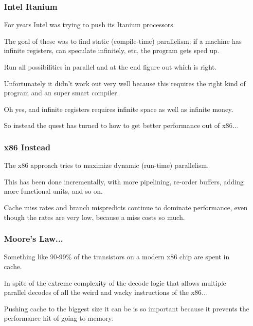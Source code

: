 \begin{frame}
\frametitle{Intel Itanium}

For years Intel was trying to push its Itanium processors. 

The goal of these was to find static (compile-time) parallelism: if a machine has infinite registers, can speculate infinitely, etc, the program gets sped up. 

Run all possibilities in parallel and at the end figure out which is right.

Unfortunately it didn't work out very well because this requires the right kind of program and an super smart compiler. 

Oh yes, and infinite registers requires infinite space as well as infinite money. 

So instead the quest has turned to how to get better performance out of x86...

\end{frame}



\begin{frame}
\frametitle{x86 Instead}

The x86 approach tries to maximize dynamic (run-time) parallelism. 

This has been done incrementally, with more pipelining, re-order buffers, adding more functional units, and so on. 

Cache miss rates and branch mispredicts continue to dominate performance, even though the rates are very low, because a miss costs so much. 

\end{frame}



\begin{frame}
\frametitle{Moore's Law...}

Something like 90-99\% of the transistors on a modern x86 chip are spent in cache. 

In spite of the extreme complexity of the decode logic that allows multiple parallel decodes of all the weird and wacky instructions of the x86...

Pushing cache to the biggest size it can be is so important because it prevents the performance hit of going to memory.


\end{frame}



